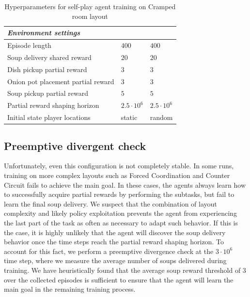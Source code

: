 \begin{table}[htbp]
\begin{tabular}{lll}
    \textit{Environment settings}                &                                   &                                   \\ \midrule                                
    Episode length                               & $400$                             & $400$                             \\
    Soup delivery shared reward                  & $20$                              & $20$                              \\
    Dish pickup partial reward                   & $3$                               & $3$                               \\
    Onion pot placement partial reward           & $3$                               & $3$                               \\
    Soup pickup partial reward                   & $5$                               & $5$                               \\
    Partial reward shaping horizon               & $2.5\cdot 10^6$                   & $2.5\cdot 10^6$                   \\
    Initial state player locations               & static                            & random                            \\
   \bottomrule
  \end{tabular}
  \caption{Hyperparameters for self-play agent training on Cramped room layout}
  \label{tab:hyperparameters-algo}
\end{table}

\subsection*{Preemptive divergent check}
Unfortunately, even this configuration is not completely stable.
In some runs, training on more complex layouts such as Forced Coordination and Counter Circuit fails to achieve the main goal.
In these cases, the agents always learn how to successfully acquire partial rewards by performing the subtasks, but fail to learn the final soup delivery.
We suspect that the combination of layout complexity and likely policy exploitation prevents the agent from experiencing the last part of the task as often as necessary to adapt such behavior.
If this is the case, it is highly unlikely that the agent will discover the soup delivery behavior once the time steps reach the partial reward shaping horizon.
To account for this fact, we perform a preemptive divergence check at the $3\cdot10^6$ time step, where we measure the average number of soups delivered during training.
We have heuristically found that the average soup reward threshold of $3$ over the collected episodes is sufficient to ensure that the agent will learn the main goal in the remaining training process.



